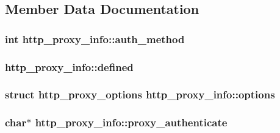 \subsection{Member Data Documentation}
\hypertarget{structhttp__proxy__info_ace0d81b0493e4857ea663108fc4e29d2}{}
\subsubsection[{auth\+\_\+method}]{\setlength{\rightskip}{0pt plus 5cm}int http\+\_\+proxy\+\_\+info\+::auth\+\_\+method}\label{structhttp__proxy__info_ace0d81b0493e4857ea663108fc4e29d2}
\hypertarget{structhttp__proxy__info_a3d9c07bca44f1fe1b06481e46e618742}{}
\subsubsection[{defined}]{ http\+\_\+proxy\+\_\+info\+::defined}\label{structhttp__proxy__info_a3d9c07bca44f1fe1b06481e46e618742}
\hypertarget{structhttp__proxy__info_aff84dc2217f3870663cf07fb1030bfc0}{}
\subsubsection[{options}]{\setlength{\rightskip}{0pt plus 5cm}struct {\bf http\+\_\+proxy\+\_\+options} http\+\_\+proxy\+\_\+info\+::options}\label{structhttp__proxy__info_aff84dc2217f3870663cf07fb1030bfc0}
\hypertarget{structhttp__proxy__info_afa05059793372786e98b9a5f914e6feb}{}
\subsubsection[{proxy\+\_\+authenticate}]{\setlength{\rightskip}{0pt plus 5cm}char$\ast$ http\+\_\+proxy\+\_\+info\+::proxy\+\_\+authenticate}\label{structhttp__proxy__info_afa05059793372786e98b9a5f914e6feb}
\hypertarget{structhttp__proxy__info_ae7c8574af511f9ccd61159a2efdebae5}{}

